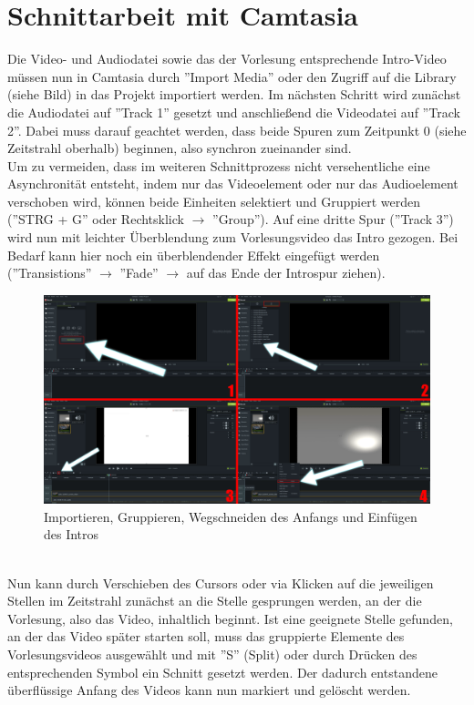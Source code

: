 \documentclass{scrreprt}
\begin{document}
\section{Schnittarbeit mit Camtasia}
Die Video- und Audiodatei sowie das der Vorlesung entsprechende Intro-Video müssen nun in Camtasia durch ''Import Media'' oder den Zugriff auf die Library (siehe Bild) in das Projekt importiert werden. Im nächsten Schritt wird zunächst die Audiodatei auf ''Track 1'' gesetzt und anschließend die Videodatei auf ''Track 2''. Dabei muss darauf geachtet werden, dass beide Spuren zum Zeitpunkt 0 (siehe Zeitstrahl oberhalb) beginnen, also synchron zueinander sind.
\\Um zu vermeiden, dass im weiteren Schnittprozess nicht versehentliche eine Asynchronität entsteht, indem nur das Videoelement oder nur das Audioelement verschoben wird, können beide Einheiten selektiert und Gruppiert werden (''STRG + G'' oder Rechtsklick $\rightarrow$ ''Group''). Auf eine dritte Spur (''Track 3'') wird nun mit leichter Überblendung zum Vorlesungsvideo das Intro gezogen. Bei Bedarf kann hier noch ein überblendender Effekt eingefügt werden (''Transistions'' $\rightarrow$ ''Fade'' $\rightarrow$ auf das Ende der Introspur ziehen).
\\
\begin{figure}[h]
    \centering
    \includegraphics[width=1\textwidth]{foursteps.png}
    \caption{Importieren, Gruppieren, Wegschneiden des Anfangs und Einfügen des Intros}
    \label{fig:foursteps}
\end{figure}
\pagebreak
\\
Nun kann durch Verschieben des Cursors oder via Klicken auf die jeweiligen Stellen im Zeitstrahl zunächst an die Stelle gesprungen werden, an der die Vorlesung, also das Video, inhaltlich beginnt. Ist eine geeignete Stelle gefunden, an der das Video später starten soll, muss das gruppierte Elemente des Vorlesungsvideos ausgewählt und mit ''S'' (Split) oder durch Drücken des entsprechenden Symbol ein Schnitt gesetzt werden. Der dadurch entstandene überflüssige Anfang des Videos kann nun markiert und gelöscht werden.\\
\end{document}
